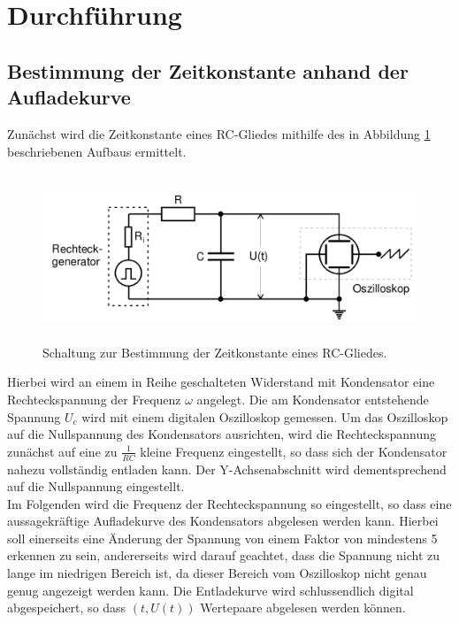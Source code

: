 \section{Durchführung}
\label{sec:Durchführung}
\subsection{Bestimmung der Zeitkonstante anhand der Aufladekurve}
Zunächst wird die Zeitkonstante eines RC-Gliedes mithilfe des in Abbildung \ref{fig:aufbau_a} beschriebenen Aufbaus ermittelt.
\begin{figure}[H]
  \centering
  \includegraphics[height=5cm]{aufbau_a.png}
  \caption{Schaltung zur Bestimmung der Zeitkonstante eines RC-Gliedes. \cite{sample}}
  \label{fig:aufbau_a}
\end{figure}
Hierbei wird an einem in Reihe geschalteten Widerstand mit Kondensator eine Rechteckspannung der Frequenz $\omega$ angelegt.
Die am Kondensator entstehende Spannung $U_c$ wird mit einem digitalen Oszilloskop gemessen.
Um das Oszilloskop auf die Nullspannung des Kondensators ausrichten, wird die Rechteckspannung zunächst auf eine zu $\frac{1}{RC}$ kleine Frequenz eingestellt, so dass sich der Kondensator nahezu vollständig entladen kann.
Der Y-Achsenabschnitt wird dementsprechend auf die Nullspannung eingestellt.\\
Im Folgenden wird die Frequenz der Rechteckspannung so eingestellt, so dass eine aussagekräftige Aufladekurve des Kondensators abgelesen werden kann.
Hierbei soll einerseits eine Änderung der Spannung von einem Faktor von mindestens 5 erkennen zu sein, andererseits wird darauf geachtet, dass die Spannung nicht zu lange im niedrigen Bereich ist, da dieser Bereich vom Oszilloskop nicht genau genug angezeigt werden kann.
Die Entladekurve wird schlussendlich digital abgespeichert, so dass $(t, U(t))$ Wertepaare abgelesen werden können.

